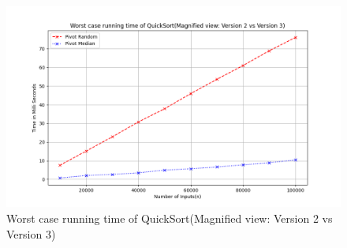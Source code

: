 \documentclass[a4paper,12pt]{report}
\begin{document}
\begin{figure}[H]
    \centering
    \includegraphics[width=1.1\textwidth]{./Worst_case_QuickSort _Magnified_view.png}
    \caption{Worst case running time of QuickSort(Magnified view: Version 2 vs Version 3)}
    \label{fig:Worst case quicksort Magnified}
\end{figure}
\end{document}
